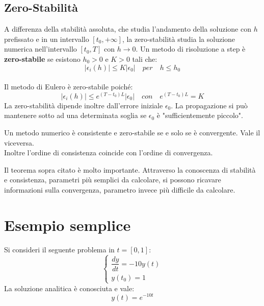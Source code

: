 \subsection{Zero-Stabilità}
A differenza della stabilità assoluta, che studia l'andamento della soluzione con $h$ prefissato e in un intervallo $[t_0, +\infty]$, la zero-stabilità studia la soluzione numerica nell'intervallo $[t_0, T]$ con $h\rightarrow 0$.
Un metodo di risoluzione a step è \textbf{zero-stabile} se esistono $h_0>0$ e $K>0$ tali che:
\begin{equation*}
	|\epsilon_i(h)| \leq K|\epsilon_0| \quad per\quad  h\leq h_0
\end{equation*}
\\Il metodo di Eulero è zero-stabile poiché:
\begin{equation*}
	|\epsilon_i(h)| \leq e^{(T-t_0)L}|\epsilon_0| \quad con \quad e^{(T-t_0)L}=K
\end{equation*}
La zero-stabilità dipende inoltre dall'errore iniziale $\epsilon_0$. La propagazione si può mantenere sotto ad una determinata soglia se $\epsilon_0$ è "sufficientemente piccolo".

\begin{theorem}
Un metodo numerico è consistente e zero-stabile se e solo se è convergente. Vale il viceversa.
\\Inoltre l'ordine di consistenza coincide con l'ordine di convergenza.
\end{theorem}
Il teorema sopra citato è molto importante. Attraverso la conoscenza di stabilità e consistenza, parametri più semplici da calcolare, si possono ricavare informazioni sulla convergenza, parametro invece più difficile da calcolare.
\section{Esempio semplice}
Si consideri il seguente problema in $t=[0,1]$:
\begin{equation*}
	\begin{cases}
		\dfrac{dy}{dt} = -10y(t) \\[0.2cm]
		y(t_{0}) = 1
	\end{cases}
\end{equation*}
La soluzione analitica è conosciuta e vale:
\begin{equation*}
	y(t) = e^{-10t}
\end{equation*}

